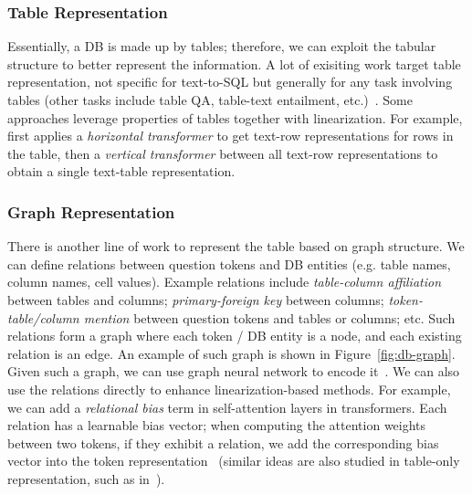 \documentclass[11pt,dvipdfm]{article}
\begin{document}
\subsubsection{Table Representation}
Essentially, a DB is made up by tables; therefore, we can exploit the tabular structure to better represent the information.
A lot of exisiting work target table representation, not specific for text-to-SQL but generally for any task involving tables (other tasks include table QA, table-text entailment, etc.)~\cite{tapas,tableformer}.
Some approaches leverage properties of tables together with linearization. For example, \cite{tabert} first applies a \textit{horizontal transformer} to get text-row representations for rows in the table, then a \textit{vertical transformer} between all text-row representations to obtain a single text-table representation.

\subsubsection{Graph Representation}
There is another line of work to represent the table based on graph structure. We can define relations between question tokens and DB entities (e.g. table names, column names, cell values). Example relations include \textit{table-column affiliation} between tables and columns; \textit{primary-foreign key} between columns; \textit{token-table/column mention} between question tokens and tables or columns; etc. Such relations form a graph where each token / DB entity is a node, and each existing relation is an edge. An example of such graph is shown in Figure~\ref{fig:db-graph}. Given such a graph, we can use graph neural network to encode it~\cite{schema-gnn,lgesql}. We can also use the relations directly to enhance linearization-based methods. For example, we can add a \textit{relational bias} term in self-attention layers in transformers. Each relation has a learnable bias vector; when computing the attention weights between two tokens, if they exhibit a relation, we add the corresponding bias vector into the token representation~\cite{ratsql,s2sql} (similar ideas are also studied in table-only representation, such as in~\cite{tableformer}).
\end{document}
